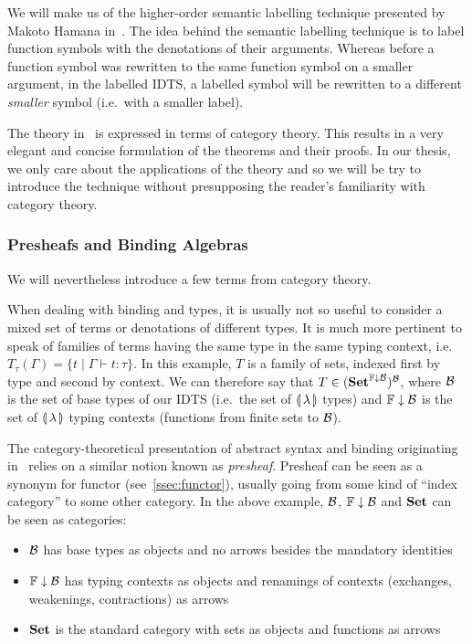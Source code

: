 We will make us of the higher-order semantic labelling technique presented
by Makoto Hamana in~\cite{hamana2007higher}. The idea behind the semantic
labelling technique is to label function symbols with the denotations of
their arguments. Whereas before a function symbol was rewritten to the same
function symbol on a smaller argument, in the labelled IDTS, a labelled
symbol will be rewritten to a different \emph{smaller} symbol (i.e.\ with a
smaller label).

The theory in~\cite{hamana2007higher} is expressed in terms of category
theory. This results in a very elegant and concise formulation of the
theorems and their proofs. In our thesis, we only care about the
applications of the theory and so we will be try to introduce the technique
without presupposing the reader's familiarity with category theory.


\subsubsection{Presheafs and Binding Algebras}
\label{sssec:presheafs-binding-algebras}

We will nevertheless introduce a few terms from category theory.

When dealing with binding and types, it is usually not so useful to
consider a mixed set of terms or denotations of different types. It is much
more pertinent to speak of families of terms having the same type in the
same typing context, i.e.\
$T_\tau(\Gamma) = \{ t \mid \Gamma \vdash t : \tau \}$. In this example,
$T$ is a family of sets, indexed first by type and second by context. We
can therefore say that $T \in (\mathbf{Set}^{{\mathbb{F}\downarrow\mathcal{B}}})^{\mathcal{B}}$, where $\mathcal{B}$ is
the set of base types of our IDTS (i.e.\ the set of $\llparenthesis \, \lambda \, \rrparenthesis$
types) and ${\mathbb{F}\downarrow\mathcal{B}}$ is the set of $\llparenthesis \, \lambda \, \rrparenthesis$ typing contexts
(functions from finite sets to $\mathcal{B}$).

The category-theoretical presentation of abstract syntax and binding
originating in~\cite{fiore2003abstract} relies on a similar notion known as
\emph{presheaf}. Presheaf can be seen as a synonym for functor
(see~\ref{ssec:functor}), usually going from some kind of ``index
category'' to some other category. In the above example, $\mathcal{B}$, ${\mathbb{F}\downarrow\mathcal{B}}$
and $\mathbf{Set}$ can be seen as categories:

\begin{itemize}
\item $\mathcal{B}$ has base types as objects and no arrows besides the mandatory
  identities
\item ${\mathbb{F}\downarrow\mathcal{B}}$ has typing contexts as objects and renamings of contexts
  (exchanges, weakenings, contractions) as arrows
\item $\mathbf{Set}$ is the standard category with sets as objects and functions
  as arrows
\end{itemize}

